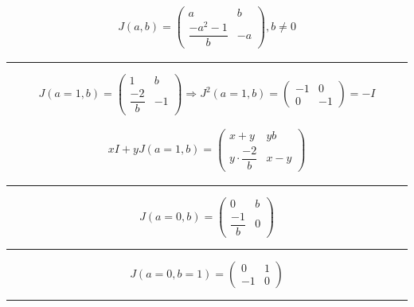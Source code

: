 \documentclass[
]{book}
\theoremstyle{definition}
\theoremstyle{definition}
\theoremstyle{definition}
\theoremstyle{definition}
\theoremstyle{remark}
\begin{document}
\[
\begin{aligned}
J\left(a,b\right)=\begin{pmatrix}a & b\\
\dfrac{-a^{2}-1}{b} & -a
\end{pmatrix},b\ne0
\end{aligned}
\]

\begin{center}\rule{0.5\linewidth}{0.5pt}\end{center}

\[
J\left(a=1,b\right)=\begin{pmatrix}1 & b\\
\dfrac{-2}{b} & -1
\end{pmatrix}\Rightarrow J^{2}\left(a=1,b\right)=\begin{pmatrix}-1 & 0\\
0 & -1
\end{pmatrix}=-I
\]

\[
\begin{aligned}
xI+yJ\left(a=1,b\right)=\begin{pmatrix}x+y & yb\\
y\cdot\dfrac{-2}{b} & x-y
\end{pmatrix}
\end{aligned}
\]

\begin{center}\rule{0.5\linewidth}{0.5pt}\end{center}

\[
J\left(a=0,b\right)=\begin{pmatrix}0 & b\\
\dfrac{-1}{b} & 0
\end{pmatrix}
\]

\begin{center}\rule{0.5\linewidth}{0.5pt}\end{center}

\[
J\left(a=0,b=1\right)=\begin{pmatrix}0 & 1\\
-1 & 0
\end{pmatrix}
\]

\begin{center}\rule{0.5\linewidth}{0.5pt}\end{center}
\end{document}
